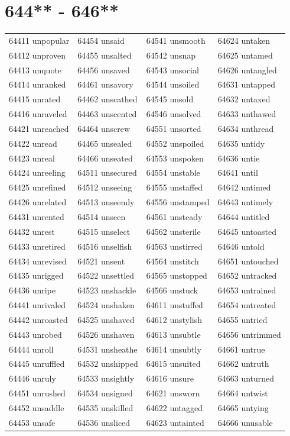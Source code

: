 \documentclass[10pt, oneside]{book}
\begin{document}
\begin{table}
	\centering
	\section*{644** - 646**}
	\begin{tabular}{l l l l}
64411 unpopular &64454 unsaid &64541 unsmooth &64624 untaken\\
64412 unproven &64455 unsalted &64542 unsnap &64625 untamed\\
64413 unquote &64456 unsaved &64543 unsocial &64626 untangled\\
64414 unranked &64461 unsavory &64544 unsoiled &64631 untapped\\
64415 unrated &64462 unscathed &64545 unsold &64632 untaxed\\
64416 unraveled &64463 unscented &64546 unsolved &64633 unthawed\\
64421 unreached &64464 unscrew &64551 unsorted &64634 unthread\\
64422 unread &64465 unsealed &64552 unspoiled &64635 untidy\\
64423 unreal &64466 unseated &64553 unspoken &64636 untie\\
64424 unreeling &64511 unsecured &64554 unstable &64641 until\\
64425 unrefined &64512 unseeing &64555 unstaffed &64642 untimed\\
64426 unrelated &64513 unseemly &64556 unstamped &64643 untimely\\
64431 unrented &64514 unseen &64561 unsteady &64644 untitled\\
64432 unrest &64515 unselect &64562 unsterile &64645 untoasted\\
64433 unretired &64516 unselfish &64563 unstirred &64646 untold\\
64434 unrevised &64521 unsent &64564 unstitch &64651 untouched\\
64435 unrigged &64522 unsettled &64565 unstopped &64652 untracked\\
64436 unripe &64523 unshackle &64566 unstuck &64653 untrained\\
64441 unrivaled &64524 unshaken &64611 unstuffed &64654 untreated\\
64442 unroasted &64525 unshaved &64612 unstylish &64655 untried\\
64443 unrobed &64526 unshaven &64613 unsubtle &64656 untrimmed\\
64444 unroll &64531 unsheathe &64614 unsubtly &64661 untrue\\
64445 unruffled &64532 unshipped &64615 unsuited &64662 untruth\\
64446 unruly &64533 unsightly &64616 unsure &64663 unturned\\
64451 unrushed &64534 unsigned &64621 unsworn &64664 untwist\\
64452 unsaddle &64535 unskilled &64622 untagged &64665 untying\\
64453 unsafe &64536 unsliced &64623 untainted &64666 unusable\\
	\end{tabular}
 \end{table}
\clearpage
\end{document}
